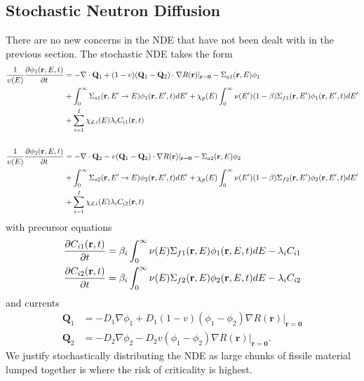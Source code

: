 \documentclass[12pt]{article}
\begin{document}
\subsection{Stochastic Neutron Diffusion}
There are no new concerns in the NDE that have not been dealt with in the previous section. The stochastic NDE takes the form
\begin{align}
    \frac{1}{\upsilon(E)} \frac{\partial \phi_1 (\bold{r},E,t)}{\partial t}&= -\nabla \cdot \mathbf{Q}_1+(1-v)(\mathbf{Q}_1-\mathbf{Q}_2)\cdot \nabla R(\mathbf{r})|_{\mathbf{r}=\mathbf{0}}-\Sigma_{a1} (\bold{r},E)\phi_1 \notag \\ &+\int_{0}^{\infty}\Sigma_{s1}(\bold{r}, E'\rightarrow E)\phi_1(\bold{r},E',t)dE'  +\chi_p(E) \int_0 ^{\infty} \nu(E') (1-\beta)\Sigma_{f1} (\bold{r},E')\phi_1(\bold{r},E',t)dE' \notag \\ 
    &+\sum_{i=1}^{I} \chi_{d,i}(E)\lambda_i C_{i1}(\bold{r},t) 
    \\ \notag \\ 
    \frac{1}{\upsilon(E)} \frac{\partial \phi_2 (\bold{r},E,t)}{\partial t}&= -\nabla \cdot \mathbf{Q}_2-v(\mathbf{Q}_1-\mathbf{Q}_2)\cdot \nabla R(\mathbf{r})|_{\mathbf{r}=\mathbf{0}}-\Sigma_{a2} (\bold{r},E)\phi_2 \notag \\ &+\int_{0}^{\infty}\Sigma_{s2}(\bold{r}, E'\rightarrow E)\phi_2(\bold{r},E',t)dE'  +\chi_p(E) \int_0 ^{\infty} \nu(E') (1-\beta)\Sigma_{f2} (\bold{r},E')\phi_2(\bold{r},E',t)dE' \notag \\ 
    &+\sum_{i=1}^{I} \chi_{d,i}(E)\lambda_i C_{i2}(\bold{r},t)
\end{align}
with precursor equations 
\begin{align}
    \frac{\partial C_{i1}({\bold{r},t)}}{\partial t}&=\beta_i \int_0^\infty \nu(E) \Sigma_{f1} (\bold{r},E) \phi_1(\bold{r}, E,t)dE-\lambda_i C_{i1} \\
    \frac{\partial C_{i2}({\bold{r},t)}}{\partial t}&=\beta_i \int_0^\infty \nu(E) \Sigma_{f2} (\bold{r},E) \phi_2(\bold{r}, E,t)dE-\lambda_i C_{i2}
\end{align}
and currents 
\begin{align}
    \mathbf{Q}_1 &= -D_1 \nabla \phi_1 +D_1 (1-v)(\phi_1 -\phi_2) \nabla R(\mathbf{r})|_{\mathbf{r}=\mathbf{0}} \label{Q1}\\
    \mathbf{Q}_2 &= -D_2 \nabla \phi_2 -D_2 v(\phi_1 -\phi_2) \nabla R(\mathbf{r})|_{\mathbf{r}=\mathbf{0}}. \label{Q2}
\end{align}
We justify stochastically distributing the NDE as large chunks of fissile material lumped together is where the risk of criticality is highest.
\end{document}
